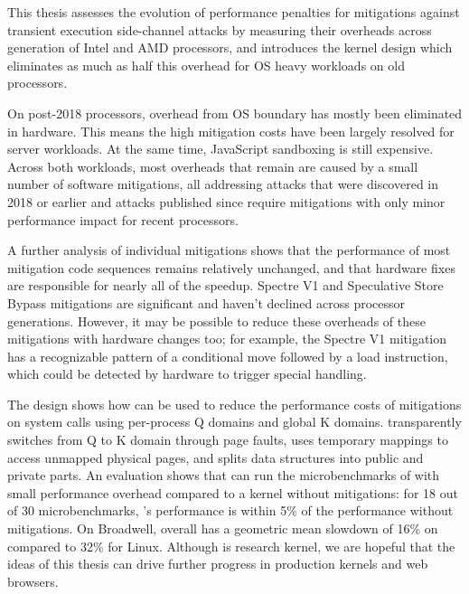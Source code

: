 \label{s:concl}

This thesis assesses the evolution of performance penalties for
mitigations against transient execution side-channel attacks by
measuring their overheads across generation of Intel and AMD
processors, and introduces the \sys kernel design which eliminates as much
as half this overhead for OS heavy workloads on old processors.

On post-2018 processors, overhead from OS boundary has mostly been eliminated in hardware.
This means the high mitigation costs have been largely resolved for server workloads.
At the same time, JavaScript sandboxing is still expensive.
Across both workloads, most overheads that remain  are caused by a small number of software mitigations, all addressing attacks that were discovered in 2018 or earlier and attacks published since require mitigations with only minor performance impact for recent processors.

A further analysis of individual mitigations shows that the performance of most mitigation code sequences remains relatively unchanged, and that hardware fixes are responsible for nearly all of the speedup.
Spectre V1 and Speculative Store Bypass mitigations are significant and haven't declined across processor generations.
However, it may be possible to reduce these overheads of these mitigations with hardware changes too;
for example, the Spectre V1 mitigation has a recognizable pattern of a
conditional move followed by a load instruction, which could be
detected by hardware to trigger special handling.

The \sys design
shows how \contract can be used to reduce the performance costs of
mitigations on system calls using per-process Q domains and global K
domains.  \sys transparently switches from Q to K domain through page
faults, uses temporary mappings to access unmapped physical pages, and
splits data structures into public and private parts.  An evaluation
shows that \sys can run the microbenchmarks of \bench with small
performance overhead compared to a kernel without mitigations: for
18 out of 30 \bench microbenchmarks, \sys's performance is within 5\%
of the performance without mitigations.
On Broadwell, \sys overall has a geometric mean slowdown of 16\% on \bench compared to 32\% for Linux.
Although \sys is research kernel, we are hopeful that the ideas of this thesis can drive further progress in production kernels and web browsers.
